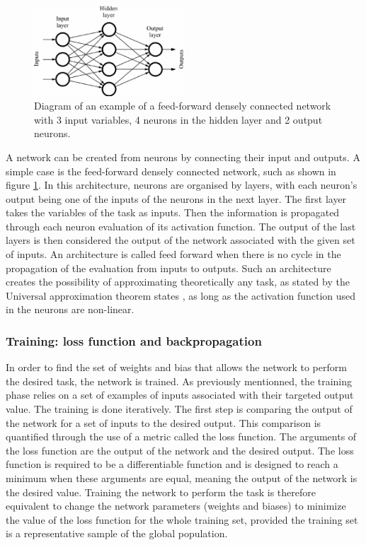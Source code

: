 \begin{figure}
    \centering
    \includegraphics[width=0.5\textwidth]{Images/dense_network.png}
    \caption{Diagram of an example of a feed-forward densely connected network with 3 input variables, 4 neurons in the hidden layer and 2 output neurons.}
    \label{fig:dense_network}
\end{figure}

A network can be created from neurons by connecting their input and outputs. A simple case is the feed-forward densely connected network, such as shown in figure \ref{fig:dense_network}. In this architecture, neurons are organised by layers, with each neuron's output being one of the inputs of the neurons in the next layer. The first layer takes the variables of the task as inputs. Then the information is propagated through each neuron evaluation of its activation function. The output of the last layers is then considered the output of the network associated with the given set of inputs. An architecture is called feed forward when there is no cycle in the propagation of the evaluation from inputs to outputs. Such an architecture creates the possibility of approximating theoretically any task, as stated by the Universal approximation theorem states \cite{Cybenko1989}, as long as the activation function used in the neurons are non-linear.

\subsubsection{Training: loss function and backpropagation}

In order to find the set of weights and bias that allows the network to perform the desired task, the network is trained.
As previously mentionned, the training phase relies on a set of examples of inputs associated with their targeted output value. The training is done iteratively. The first step is comparing the output of the network for a set of inputs to the desired output. This comparison is quantified through the use of a metric called the loss function. The arguments of the loss function are the output of the network and the desired output. The loss function is required to be a differentiable function and is designed to reach a minimum when these arguments are equal, meaning the output of the network is the desired value. Training the network to perform the task is therefore equivalent to change the network parameters (weights and biases) to minimize the value of the loss function for the whole training set, provided the training set is a representative sample of the global population.

